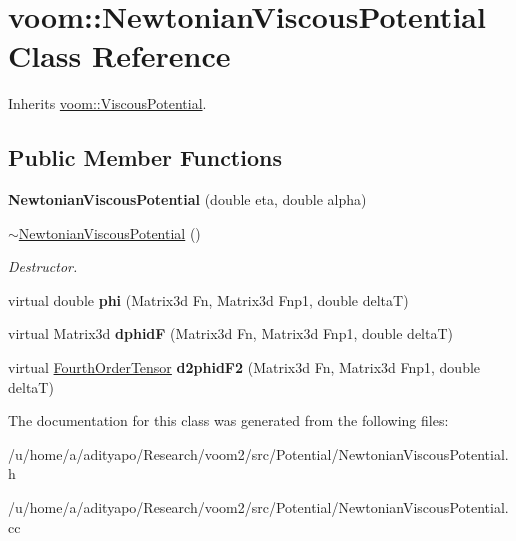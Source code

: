 \hypertarget{classvoom_1_1_newtonian_viscous_potential}{
\section{voom::NewtonianViscousPotential Class Reference}
\label{classvoom_1_1_newtonian_viscous_potential}
}


Inherits \hyperlink{classvoom_1_1_viscous_potential}{voom::ViscousPotential}.\subsection*{Public Member Functions}
\begin{DoxyCompactItemize}
\item 
\hypertarget{classvoom_1_1_newtonian_viscous_potential_a78a6d03c8794a1b116725965e7533d5b}{
{\bfseries NewtonianViscousPotential} (double eta, double alpha)}
\label{classvoom_1_1_newtonian_viscous_potential_a78a6d03c8794a1b116725965e7533d5b}

\item 
\hypertarget{classvoom_1_1_newtonian_viscous_potential_a2fb03f5d708e62381bdf03fa473c538c}{
\hyperlink{classvoom_1_1_newtonian_viscous_potential_a2fb03f5d708e62381bdf03fa473c538c}{$\sim$NewtonianViscousPotential} ()}
\label{classvoom_1_1_newtonian_viscous_potential_a2fb03f5d708e62381bdf03fa473c538c}

\begin{DoxyCompactList}\small\item\em Destructor. \item\end{DoxyCompactList}\item 
\hypertarget{classvoom_1_1_newtonian_viscous_potential_a8d186823bbaf0d0316c720a90ee0a0ad}{
virtual double {\bfseries phi} (Matrix3d Fn, Matrix3d Fnp1, double deltaT)}
\label{classvoom_1_1_newtonian_viscous_potential_a8d186823bbaf0d0316c720a90ee0a0ad}

\item 
\hypertarget{classvoom_1_1_newtonian_viscous_potential_a74fd6851294285ba2cf8b5a2606c186d}{
virtual Matrix3d {\bfseries dphidF} (Matrix3d Fn, Matrix3d Fnp1, double deltaT)}
\label{classvoom_1_1_newtonian_viscous_potential_a74fd6851294285ba2cf8b5a2606c186d}

\item 
\hypertarget{classvoom_1_1_newtonian_viscous_potential_adab00a025ab17aceb1da25e31718b6f0}{
virtual \hyperlink{classvoom_1_1_fourth_order_tensor}{FourthOrderTensor} {\bfseries d2phidF2} (Matrix3d Fn, Matrix3d Fnp1, double deltaT)}
\label{classvoom_1_1_newtonian_viscous_potential_adab00a025ab17aceb1da25e31718b6f0}

\end{DoxyCompactItemize}


The documentation for this class was generated from the following files:\begin{DoxyCompactItemize}
\item 
/u/home/a/adityapo/Research/voom2/src/Potential/NewtonianViscousPotential.h\item 
/u/home/a/adityapo/Research/voom2/src/Potential/NewtonianViscousPotential.cc\end{DoxyCompactItemize}
